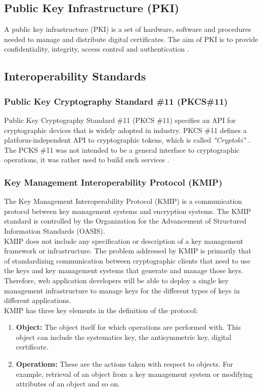 \documentclass[11pt, a4paper, notitlepage]{article}
\begin{document}
\subsection*{Public Key Infrastructure (PKI)}
A public key infrastructure (PKI) is a set of hardware, software and procedures needed to manage and distribute digital certificates. The aim of PKI is to provide confidentiality, integrity, access control and authentication \cite{PKI:Online}.


\subsection*{Interoperability Standards}
\subsubsection*{Public Key Cryptography Standard \#11 (PKCS\#11)}
Public Key Cryptography Standard \#11  (PKCS \#11) specifies an API for cryptographic devices that is widely adopted in industry. PKCS \#11 defines a platform-independent API to cryptographic tokens, which is called \emph{"Cryptoki"} \cite{bortolozzo2010attacking}. The PCKS \#11 was not intended to be a general interface to cryptographic operations, it was rather used to build such services \cite{p}.

\subsubsection*{Key Management Interoperability Protocol (KMIP)}
The Key Management Interoperability Protocol (KMIP) is a communication protocol between key management systems and encryption systems. The KMIP standard is controlled by the Organization for the Advancement of Structured Information Standards (OASIS). \\

KMIP does not include any specification or description of a key management framework or infrastructure. The problem addressed by KMIP is primarily that of standardizing communication between cryptographic clients that need to use the keys and key management systems that generate and manage those keys. Therefore, web application developers will be able to deploy a single key management infrastructure to manage keys for the different types of keys in different applications. \\

KMIP has three key elements in the definition of the protocol:
\begin{enumerate}
\item \textbf{Object:} The object itself for which operations are performed with. This object can include the systematics key, the antisymmetric key, digital certificate.
\item \textbf{Operations:} These are the actions taken with respect to objects. For example, retrieval of an object from a key management system or modifying attributes of an object and so on.
\end{enumerate}
\end{document}
